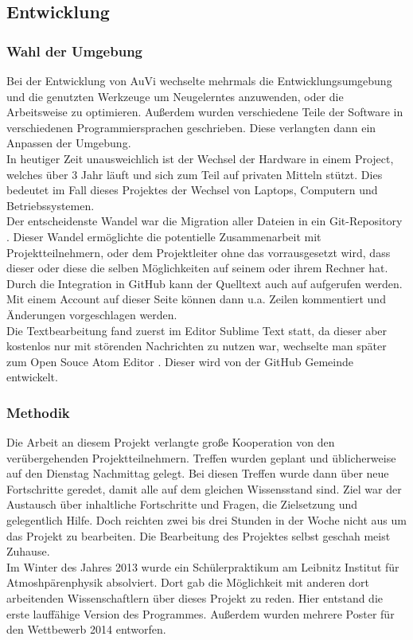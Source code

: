 \subsection{Entwicklung} %

\subsubsection{Wahl der Umgebung}\label{sec:ent} %
Bei der Entwicklung von AuVi wechselte mehrmals die Entwicklungsumgebung und die
genutzten Werkzeuge um Neugelerntes anzuwenden, oder die Arbeitsweise zu optimieren.
Außerdem wurden verschiedene Teile der Software in verschiedenen Programmiersprachen
geschrieben. Diese verlangten dann ein Anpassen der Umgebung.\\
In heutiger Zeit unausweichlich ist der Wechsel der Hardware in einem Project,
welches über 3 Jahr läuft und sich zum Teil auf privaten Mitteln stützt. Dies
bedeutet im Fall dieses Projektes der Wechsel von Laptops,
Computern und Betriebssystemen.\\
Der entscheidenste Wandel war die Migration aller Dateien in ein Git-Repository \cite{gitrepo}.
Dieser Wandel ermöglichte die potentielle Zusammenarbeit mit Projektteilnehmern, oder
dem Projektleiter ohne das vorrausgesetzt wird, dass dieser oder diese die selben Möglichkeiten
auf seinem oder ihrem Rechner hat. Durch die Integration in GitHub kann der Quelltext auch auf
 aufgerufen werden. Mit einem Account auf dieser
Seite können dann u.a. Zeilen kommentiert und Änderungen vorgeschlagen werden. \\
Die Textbearbeitung fand zuerst im Editor Sublime Text \cite{sublime} statt, da dieser
aber kostenlos nur mit störenden Nachrichten zu nutzen war, wechselte man später
zum Open Souce Atom Editor \cite{atomio}. Dieser wird von der GitHub Gemeinde entwickelt.

\subsubsection{Methodik} %
Die Arbeit an diesem Projekt verlangte große Kooperation
von den verübergehenden Projektteilnehmern.
Treffen wurden geplant und üblicherweise auf den Dienstag Nachmittag gelegt.
Bei diesen Treffen wurde dann über neue Fortschritte geredet,
damit alle auf dem gleichen Wissensstand sind.
Ziel war der Austausch über inhaltliche Fortschritte und Fragen, die Zielsetzung und
gelegentlich Hilfe.
Doch reichten zwei bis drei Stunden in der Woche nicht aus um das Projekt zu bearbeiten.
Die Bearbeitung des Projektes selbst geschah meist Zuhause.\\
Im Winter des Jahres 2013 wurde ein Schülerpraktikum am
Leibnitz Institut für Atmoshpärenphysik absolviert.
Dort gab die Möglichkeit mit anderen dort arbeitenden
Wissenschaftlern über dieses Projekt zu reden.
Hier entstand die erste lauffähige Version des Programmes.
Außerdem wurden mehrere Poster für den \jf Wettbewerb 2014 entworfen.

